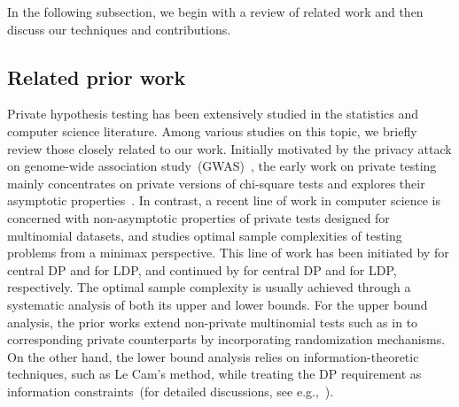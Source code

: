 \documentclass[twoside,11pt]{article}
\begin{document}
In the following subsection, we begin with a review of related work and then discuss our techniques and contributions. 

\subsection{Related prior work}\label{section:related_works}
Private hypothesis testing has been extensively studied in the statistics and computer science literature.
Among various studies on this topic, we briefly review those closely related to our work. Initially motivated by the privacy attack on genome-wide association study~(GWAS)~\citep{homer2008resolving}, the early work on private testing mainly concentrates on private versions of chi-square tests and explores their asymptotic properties~\citep{Gaboardi2016DPChisq, Gaboardi2018LDPChisq, Johnson2013PrivacyStudies, Kifer2017DPChisq, Uhler2013PrivacyStudies, Vu2009DifferentialEvaluations, Wang2015DPChisq, Yu2014Chisq}. In contrast, a recent line of work in computer science is concerned with non-asymptotic properties of private tests designed for multinomial datasets, and studies optimal sample complexities of testing problems from a minimax perspective. This line of work has been initiated by \citet{Cai2017DPGofPrivit} for central DP and \citet{Sheffet2018LDP} for LDP, and continued by \citet{Acharya2018dPGofTwosample, Aliakbarpour2019PrivatePermutations, Aliakbarpour2018DPgof} for central DP and \citet{Acharya2020Lowerbound, Acharya2021Lowerbound} for LDP, respectively. The optimal sample complexity is usually achieved through a systematic analysis of both its upper and lower bounds. For the upper bound analysis, the prior works extend non-private multinomial tests such as in \citep{Acharya2015Nonprivate, Chan2014Nonprivate, Diakonikolas2018Nonprivate, Diakonikolas2016Nonprivate, Goldreich2000Nonprivate, Valiant2017Nonprivate} to corresponding private counterparts by incorporating randomization mechanisms. On the other hand, the lower bound analysis relies on information-theoretic techniques, such as Le Cam's method, while treating the DP requirement as information constraints~(for detailed discussions, see e.g.,~\citet{Acharya2020Lowerbound, Duchi2018MinimaxEstimation}).
\end{document}
